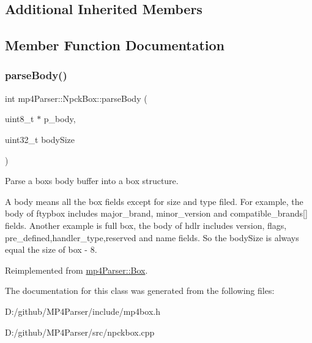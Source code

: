 \subsection*{Additional Inherited Members}


\subsection{Member Function Documentation}
\mbox{\label{classmp4_parser_1_1_npck_box_abd131fd0a9473b8f7b79500a588cc8a4}} 
\subsubsection{\texorpdfstring{parseBody()}{parseBody()}}
{\footnotesize\ttfamily int mp4\+Parser\+::\+Npck\+Box\+::parse\+Body (\begin{DoxyParamCaption}\item[{uint8\+\_\+t $\ast$}]{p\+\_\+body,  }\item[{uint32\+\_\+t}]{body\+Size }\end{DoxyParamCaption})\hspace{0.3cm}{\ttfamily [virtual]}}



Parse a box\textquotesingle{}s body buffer into a box structure. 

A body means all the box fields except for size and type filed. For example, the body of ftypbox includes major\+\_\+brand, minor\+\_\+version and compatible\+\_\+brands\mbox{[}\mbox{]} fields. Another example is full box, the body of hdlr includes version, flags, pre\+\_\+defined,handler\+\_\+type,reserved and name fields. So the body\+Size is always equal the size of box -\/ 8. 

Reimplemented from \mbox{\hyperlink{classmp4_parser_1_1_box_a3dd0c084ac65bc77b69ac5ecaf796cb2}{mp4\+Parser\+::\+Box}}.



The documentation for this class was generated from the following files\+:\begin{DoxyCompactItemize}
\item 
D\+:/github/\+M\+P4\+Parser/include/mp4box.\+h\item 
D\+:/github/\+M\+P4\+Parser/src/npckbox.\+cpp\end{DoxyCompactItemize}
